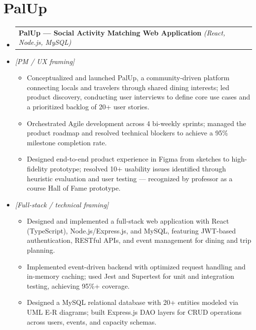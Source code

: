 \documentclass[letterpaper,10pt]{article}
\makeatletter
\newcommand{\resumeItem}[1]{\item\small{{#1\vspace{-2pt}}}}
\newcommand{\resumeProjectHeading}[2]{
  \item\begin{tabular*}{0.97\textwidth}{l@{\extracolsep{\fill}}r}
    \small#1 & #2 \\
  \end{tabular*}\vspace{-7pt}}
\newcommand{\resumeNote}[1]{\item\small{\textit{[#1]}}\vspace{-4pt}}
\newcommand{\resumeSubHeadingListStart}{\begin{itemize}[leftmargin=0.15in,label={}]}
\newcommand{\resumeSubHeadingListEnd}{\end{itemize}}
\newcommand{\resumeItemListStart}{\begin{itemize}}
\newcommand{\resumeItemListEnd}{\end{itemize}\vspace{-5pt}}
\makeatother
\begin{document}
\section{PalUp}
\resumeSubHeadingListStart
  \resumeProjectHeading{\textbf{PalUp --- Social Activity Matching Web Application} \emph{(React, Node.js, MySQL)}}{}

  \resumeNote{PM / UX framing}
  \resumeItemListStart
    \resumeItem{Conceptualized and launched PalUp, a community-driven platform connecting locals and travelers through shared dining interests; led product discovery, conducting user interviews to define core use cases and a prioritized backlog of 20+ user stories.}
    \resumeItem{Orchestrated Agile development across 4 bi-weekly sprints; managed the product roadmap and resolved technical blockers to achieve a 95\% milestone completion rate.}
    \resumeItem{Designed end-to-end product experience in Figma from sketches to high-fidelity prototype; resolved 10+ usability issues identified through heuristic evaluation and user testing --- recognized by professor as a course Hall of Fame prototype.}
  \resumeItemListEnd

  \resumeNote{Full-stack / technical framing}
  \resumeItemListStart
    \resumeItem{Designed and implemented a full-stack web application with React (TypeScript), Node.js/Express.js, and MySQL, featuring JWT-based authentication, RESTful APIs, and event management for dining and trip planning.}
    \resumeItem{Implemented event-driven backend with optimized request handling and in-memory caching; used Jest and Supertest for unit and integration testing, achieving 95\%+ coverage.}
    \resumeItem{Designed a MySQL relational database with 20+ entities modeled via UML E-R diagrams; built Express.js DAO layers for CRUD operations across users, events, and capacity schemas.}
  \resumeItemListEnd
\resumeSubHeadingListEnd
\end{document}
